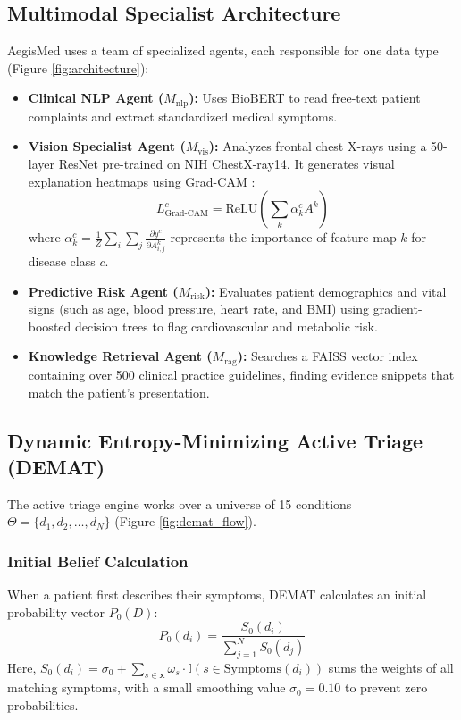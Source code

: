 \documentclass[10pt,twocolumn]{article}
\begin{document}
\subsection{Multimodal Specialist Architecture}
AegisMed uses a team of specialized agents, each responsible for one data type (Figure \ref{fig:architecture}):
\begin{itemize}
    \item \textbf{Clinical NLP Agent ($M_{\text{nlp}}$):} Uses BioBERT \cite{lee2020biobert} to read free-text patient complaints and extract standardized medical symptoms.
    \item \textbf{Vision Specialist Agent ($M_{\text{vis}}$):} Analyzes frontal chest X-rays using a 50-layer ResNet \cite{he2016deep} pre-trained on NIH ChestX-ray14. It generates visual explanation heatmaps using Grad-CAM \cite{selvaraju2017grad}:
    \begin{equation}
    L_{\text{Grad-CAM}}^c = \text{ReLU}\left(\sum_k \alpha_k^c A^k\right)
    \end{equation}
    where $\alpha_k^c = \frac{1}{Z}\sum_i \sum_j \frac{\partial y^c}{\partial A_{i,j}^k}$ represents the importance of feature map $k$ for disease class $c$.
    \item \textbf{Predictive Risk Agent ($M_{\text{risk}}$):} Evaluates patient demographics and vital signs (such as age, blood pressure, heart rate, and BMI) using gradient-boosted decision trees \cite{chen2016xgboost} to flag cardiovascular and metabolic risk.
    \item \textbf{Knowledge Retrieval Agent ($M_{\text{rag}}$):} Searches a FAISS vector index \cite{johnson2019billion} containing over 500 clinical practice guidelines, finding evidence snippets that match the patient's presentation.
\end{itemize}

\subsection{Dynamic Entropy-Minimizing Active Triage (DEMAT)}
The active triage engine works over a universe of 15 conditions $\Theta = \{d_1, d_2, \dots, d_N\}$ (Figure \ref{fig:demat_flow}).

\subsubsection{Initial Belief Calculation}
When a patient first describes their symptoms, DEMAT calculates an initial probability vector $P_0(D)$:
\begin{equation}
P_0(d_i) = \frac{S_0(d_i)}{\sum_{j=1}^N S_0(d_j)}
\end{equation}
Here, $S_0(d_i) = \sigma_0 + \sum_{s \in \mathbf{x}} \omega_s \cdot \mathbb{I}(s \in \text{Symptoms}(d_i))$ sums the weights of all matching symptoms, with a small smoothing value $\sigma_0 = 0.10$ to prevent zero probabilities.
\end{document}
